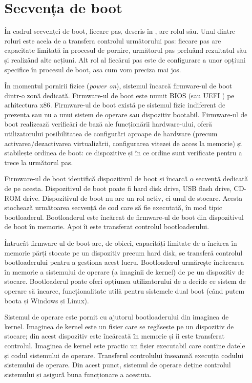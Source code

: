 \section{Secvența de boot}
\label{sec:boot:sequence}

În cadrul secvenței de boot, fiecare pas, descris în
, are rolul său. Unul dintre
roluri este acela de a transfera controlul următorului pas: fiecare pas are
capacitate limitată în procesul de pornire, următorul pas preluând rezultatul
său și realizând alte acțiuni. Alt rol al fiecărui pas este de configurare a
unor opțiuni specifice în procesul de boot, așa cum vom preciza mai jos.

În momentul pornirii fizice (\textit{power on}), sistemul încarcă firmware-ul de boot dintr-o zonă
dedicată. Firmware-ul de boot este
numit BIOS (sau UEFI ) pe
arhitectura x86. Firmware-ul de boot există pe sistemul fizic indiferent de
prezența sau nu a unui sistem de operare sau dispozitiv bootabil. Firmware-ul de
boot realizează verificări de bază ale funcționării hardware-ului, oferă
utilizatorului posibilitatea de configurări aproape de hardware (precum
activarea/dezactivarea virtualizării, configurarea vitezei de acces la memorie)
și stabilește ordinea de boot: ce dispozitive și în ce ordine sunt verificate
pentru a trece la următorul pas.

Firmware-ul de boot identifică dispozitivul de boot și încarcă o secvență
dedicată de pe acesta. Dispozitivul de boot poate fi hard disk drive, USB flash
drive, CD-ROM drive. Dispozitivul de boot nu are un rol activ, ci unul de
stocare. Acesta stochează următoarea secvență de cod care să fie executată, în
mod tipic bootloaderul. Bootloaderul este încărcat de firmware-ul de
boot din dispozitivul de boot în memorie. Apoi îi este transferat controlul
bootloaderului.

Întrucât firmware-ul de boot are, de obicei, capacități limitate de a încărca în
memorie părți stocate pe un dispozitiv precum hard disk, se transferă controlul
bootloaderului pentru a gestiona acest lucru. Bootloaderul urmărește
încărcarea în memorie a sistemului de operare (a imaginii de kernel) de pe un dispozitiv de stocare.
Bootloaderul poate oferi opțiunea
utilizatorului de a decide ce sistem de operare să încarce, funcționalitate
utilă pentru sistemele dual boot (când putem boota și Windows și Linux).

Sistemul de operare este pornit cu ajutorul bootloaderului din imaginea de
kernel. Imaginea de kernel este un fișier care se regăsește pe un dispozitiv de
stocare; din acest dispozitiv este încărcată în memorie și îi este transferat controlul.
Imaginea de kernel este practic un fișier executabil care conține datele și
codul sistemului de operare. Transferul controlului înseamnă execuția codului
sistemului de operare. Din acest punct, sistemul de operare deține controlul
sistemului și asigură buna funcționare a acestuia.

